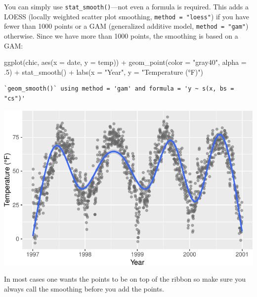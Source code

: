 \documentclass[
  letterpaper,
]{scrbook}
\newenvironment{Shaded}{\begin{snugshade}}{\end{snugshade}}
\newcommand{\AttributeTok}[1]{\textcolor[rgb]{0.40,0.45,0.13}{#1}}
\newcommand{\DecValTok}[1]{\textcolor[rgb]{0.68,0.00,0.00}{#1}}
\newcommand{\FunctionTok}[1]{\textcolor[rgb]{0.28,0.35,0.67}{#1}}
\newcommand{\NormalTok}[1]{\textcolor[rgb]{0.00,0.23,0.31}{#1}}
\newcommand{\SpecialCharTok}[1]{\textcolor[rgb]{0.37,0.37,0.37}{#1}}
\newcommand{\StringTok}[1]{\textcolor[rgb]{0.13,0.47,0.30}{#1}}
\begin{document}
You can simply use \texttt{stat\_smooth()}---not even a formula is
required. This adds a LOESS (locally weighted scatter plot smoothing,
\texttt{method\ =\ "loess"}) if you have fewer than 1000 points or a GAM
(generalized additive model, \texttt{method\ =\ "gam"}) otherwise. Since
we have more than 1000 points, the smoothing is based on a GAM:

\begin{Shaded}
\begin{Highlighting}[]
\FunctionTok{ggplot}\NormalTok{(chic, }\FunctionTok{aes}\NormalTok{(}\AttributeTok{x =}\NormalTok{ date, }\AttributeTok{y =}\NormalTok{ temp)) }\SpecialCharTok{+}
  \FunctionTok{geom\_point}\NormalTok{(}\AttributeTok{color =} \StringTok{"gray40"}\NormalTok{, }\AttributeTok{alpha =}\NormalTok{ .}\DecValTok{5}\NormalTok{) }\SpecialCharTok{+}
  \FunctionTok{stat\_smooth}\NormalTok{() }\SpecialCharTok{+}
  \FunctionTok{labs}\NormalTok{(}\AttributeTok{x =} \StringTok{"Year"}\NormalTok{, }\AttributeTok{y =} \StringTok{"Temperature (°F)"}\NormalTok{) }
\end{Highlighting}
\end{Shaded}

\begin{verbatim}
`geom_smooth()` using method = 'gam' and formula = 'y ~ s(x, bs = "cs")'
\end{verbatim}

\includegraphics{ch17_files/figure-pdf/stat-smooth-1.pdf}

\begin{tcolorbox}[enhanced jigsaw, rightrule=.15mm, arc=.35mm, title=\textcolor{quarto-callout-note-color}{\faInfo}\hspace{0.5em}{Note}, colback=white, toptitle=1mm, colbacktitle=quarto-callout-note-color!10!white, breakable, left=2mm, opacityback=0, leftrule=.75mm, bottomrule=.15mm, bottomtitle=1mm, colframe=quarto-callout-note-color-frame, coltitle=black, toprule=.15mm, opacitybacktitle=0.6, titlerule=0mm]

In most cases one wants the points to be on top of the ribbon so make
sure you always call the smoothing before you add the points.

\end{tcolorbox}
\end{document}
